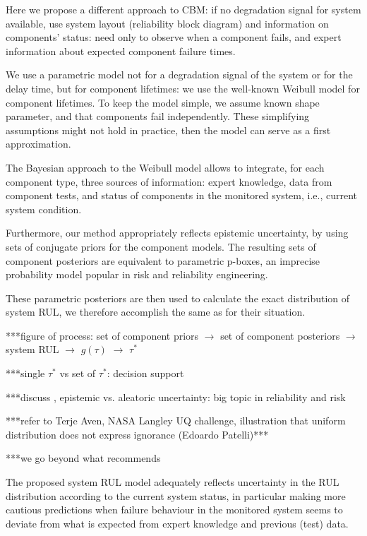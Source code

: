 \documentclass[authoryear]{elsarticle}
\begin{document}
Here we propose a different approach to CBM: if no degradation signal for system available,
use system layout (reliability block diagram) and information on components' status:
need only to observe when a component fails,
and expert information about expected component failure times.

We use a parametric model not for a degradation signal of the system or for the delay time, but for component lifetimes:
we use the well-known Weibull model for component lifetimes.
To keep the model simple, we assume known shape parameter,
and that components fail independently.
These simplifying assumptions might not hold in practice,
then the model can serve as a first approximation.

The Bayesian approach to the Weibull model allows to integrate, for each component type,
three sources of information: expert knowledge, data from component tests,
and status of components in the monitored system, i.e., current system condition.

Furthermore, our method appropriately reflects epistemic uncertainty,
by using sets of conjugate priors \citep{diss} for the component models.
The resulting sets of component posteriors are equivalent to parametric p-boxes,
an imprecise probability model popular in risk and reliability engineering.

These parametric posteriors are then used to calculate the exact distribution of system RUL,
we therefore accomplish the same as \cite{2013:si-et-al} for their situation.

***figure of process: set of component priors $\to$ set of component posteriors $\to$ system RUL $\to$ $g(\tau)$ $\to$ $\tau^*$

***single $\tau^*$ vs set of $\tau^*$: decision support

***discuss \cite{2015:sankararaman}, epistemic vs. aleatoric uncertainty: big topic in reliability and risk

***refer to Terje Aven, NASA Langley UQ challenge, illustration that uniform distribution does not express ignorance (Edoardo Patelli)***

***we go beyond what \cite{2015:sankararaman} recommends

The proposed system RUL model adequately reflects uncertainty in the RUL distribution
according to the current system status,
in particular making more cautious predictions when failure behaviour in the monitored system
seems to deviate from what is expected from expert knowledge and previous (test) data.
\end{document}
